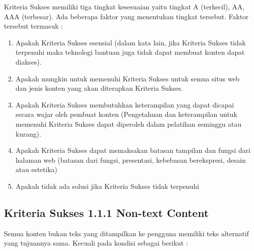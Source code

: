 Kriteria Sukses memiliki tiga tingkat kesesuaian yaitu tingkat A (terkecil), AA, AAA (terbesar). Ada beberapa faktor yang menentukan tingkat tersebut. Faktor tersebut termasuk :

\begin{enumerate}
	\item Apakah Kriteria Sukses esensial (dalam kata lain, jika Kriteria Sukses tidak terpenuhi maka teknologi bantuan juga tidak dapat membuat konten dapat diakses).
	\item Apakah mungkin untuk memenuhi Kriteria Sukses untuk semua situs web dan jenis konten yang akan diterapkan Kriteria Sukses.
	\item Apakah Kriteria Sukses membutuhkan keterampilan yang dapat dicapai secara wajar oleh pembuat konten (Pengetahuan dan keterampilan untuk memenuhi Kriteria Sukses dapat diperoleh dalam pelatihan seminggu atau kurang).
	\item Apakah Kriteria Sukses dapat memaksakan batasan tampilan dan fungsi dari halaman web (batasan dari fungsi, presentasi, kebebasan berekspresi, desain atau estetika)
	\item Apakah tidak ada solusi jika Kriteria Sukses tidak terpenuhi
\end{enumerate}

\subsection{Kriteria Sukses 1.1.1 Non-text Content}
\label{sec:kriteria_1.1.1}
Semua konten bukan teks yang ditampilkan ke pengguna memiliki teks alternatif yang tujuannya sama. Kecuali pada kondisi sebagai berikut :

